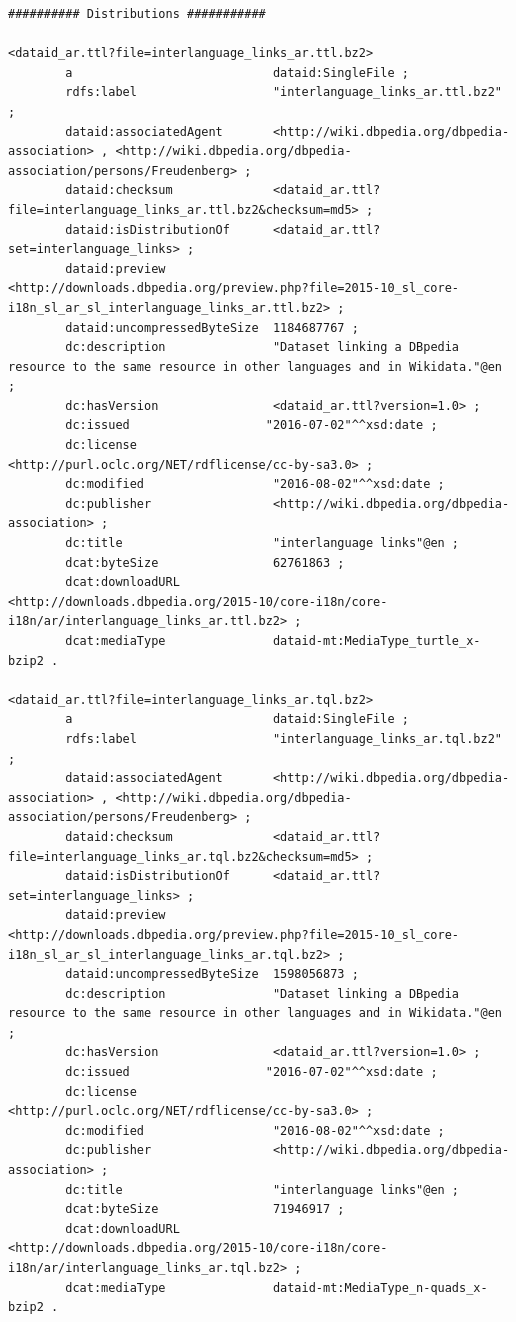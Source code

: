 \documentclass[a4paper,english,twoside,BCOR1.5cm,headsepline,DIV12,appendixprefix,final,12pt]{scrbook}
\begin{document}
\begin{lstlisting}[language=ttl, captionpos=b, label=lst:dcex,linewidth=\columnwidth,breaklines=true,basicstyle=\ttfamily\scriptsize]
########## Distributions ###########

<dataid_ar.ttl?file=interlanguage_links_ar.ttl.bz2>
        a                            dataid:SingleFile ;
        rdfs:label                   "interlanguage_links_ar.ttl.bz2" ;
        dataid:associatedAgent       <http://wiki.dbpedia.org/dbpedia-association> , <http://wiki.dbpedia.org/dbpedia-association/persons/Freudenberg> ;
        dataid:checksum              <dataid_ar.ttl?file=interlanguage_links_ar.ttl.bz2&checksum=md5> ;
        dataid:isDistributionOf      <dataid_ar.ttl?set=interlanguage_links> ;
        dataid:preview               <http://downloads.dbpedia.org/preview.php?file=2015-10_sl_core-i18n_sl_ar_sl_interlanguage_links_ar.ttl.bz2> ;
        dataid:uncompressedByteSize  1184687767 ;
        dc:description               "Dataset linking a DBpedia resource to the same resource in other languages and in Wikidata."@en ;
        dc:hasVersion                <dataid_ar.ttl?version=1.0> ;
        dc:issued                   "2016-07-02"^^xsd:date ;
        dc:license                   <http://purl.oclc.org/NET/rdflicense/cc-by-sa3.0> ;
        dc:modified                  "2016-08-02"^^xsd:date ;
        dc:publisher                 <http://wiki.dbpedia.org/dbpedia-association> ;
        dc:title                     "interlanguage links"@en ;
        dcat:byteSize                62761863 ;
        dcat:downloadURL             <http://downloads.dbpedia.org/2015-10/core-i18n/core-i18n/ar/interlanguage_links_ar.ttl.bz2> ;
        dcat:mediaType               dataid-mt:MediaType_turtle_x-bzip2 .

<dataid_ar.ttl?file=interlanguage_links_ar.tql.bz2>
        a                            dataid:SingleFile ;
        rdfs:label                   "interlanguage_links_ar.tql.bz2" ;
        dataid:associatedAgent       <http://wiki.dbpedia.org/dbpedia-association> , <http://wiki.dbpedia.org/dbpedia-association/persons/Freudenberg> ;
        dataid:checksum              <dataid_ar.ttl?file=interlanguage_links_ar.tql.bz2&checksum=md5> ;
        dataid:isDistributionOf      <dataid_ar.ttl?set=interlanguage_links> ;
        dataid:preview               <http://downloads.dbpedia.org/preview.php?file=2015-10_sl_core-i18n_sl_ar_sl_interlanguage_links_ar.tql.bz2> ;
        dataid:uncompressedByteSize  1598056873 ;
        dc:description               "Dataset linking a DBpedia resource to the same resource in other languages and in Wikidata."@en ;
        dc:hasVersion                <dataid_ar.ttl?version=1.0> ;
        dc:issued                   "2016-07-02"^^xsd:date ;
        dc:license                   <http://purl.oclc.org/NET/rdflicense/cc-by-sa3.0> ;
        dc:modified                  "2016-08-02"^^xsd:date ;
        dc:publisher                 <http://wiki.dbpedia.org/dbpedia-association> ;
        dc:title                     "interlanguage links"@en ;
        dcat:byteSize                71946917 ;
        dcat:downloadURL             <http://downloads.dbpedia.org/2015-10/core-i18n/core-i18n/ar/interlanguage_links_ar.tql.bz2> ;
        dcat:mediaType               dataid-mt:MediaType_n-quads_x-bzip2 .


\end{lstlisting}
\end{document}
